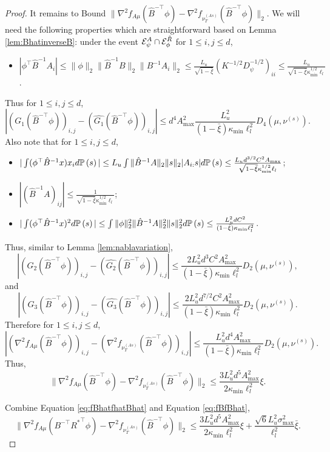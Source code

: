 \begin{proof}
	
	It remains to Bound $\|\nabla^2 f_{A\mu}(\hat{B}^{-\top}\phi) - \nabla^2 f_{\nu_T^{(As)}}(\hat{B}^{-\top}\phi)\|_2$. 
	We will need the following properties which are straightforward based on Lemma \ref{lem:BhatinverseB}: 
	under the event $ \mathcal{E}^A_{\psi}\cap \mathcal{E}^{\tilde{R}}_{\phi} $ for $1\le i, j\le d$,
	\begin{itemize}
		\item $|\phi^{\top}\hat{B}^{-1}A_i| \le \|\phi\|_2\|\hat{B}^{-1}B\|_2\|B^{-1}A_i\|_2\le
		\frac{L_u}{\sqrt{1-\bar{\xi}}} (K^{-1/2}D^{-1/2}_{\psi})_{ii}\le
		\frac{L_u}{\sqrt{1-\bar{\xi}}\kappa_{\min}^{1/2}\ell_l}$.
	\end{itemize}
	Thus for $1\le i, j\le d$,
	\[
	|(G_1(\hat{B}^{-\top}\phi))_{i,j} - (\hat{G_1}(\hat{B}^{-\top}\phi))_{i,j}| \le
	d^4A^2_{\max}\frac{L_u^2}{(1-\bar{\xi})\kappa_{\min}\ell_l^2}D_4(\mu,\nu^{(s)}).
	\]
	Also note that for $1\le i, j\le d$,
	\begin{itemize}
		\itemsep0em
		\item $|\int(\phi^{\top}\hat{B}^{-1}x)x_i d\mathbb{P}\left(s\right)| 
		\le L_u\int \|\hat{B}^{-1}A\|_2\|s\|_2 |A_{i:}s| d\mathbb{P}\left(s\right)
		\le \frac{L_ud^{3/2}C^2A_{\max}}{\sqrt{1-\bar{\xi}}\kappa_{\min}^{1/2}\ell_l}$; 
		\item $|(\hat{B}^{-1}A)_{ij}| \le \frac{1}{\sqrt{1-\bar{\xi}}\kappa_{\min}^{1/2}\ell_l}$;
		\item $|\int(\phi^{\top}\hat{B}^{-1}x)^2 d\mathbb{P}\left(s\right)|\le
		\int \|\phi\|_2^2 \|\hat{B}^{-1}A\|_2^2\|s\|_2^2 d\mathbb{P}\left(s\right) \le \frac{L_u^2dC^2}{(1-\bar{\xi})\kappa_{\min}\ell_l^2}$.
	\end{itemize}
	Thus, similar to Lemma \ref{lem:nablavariation},
	\[
	|(G_2(\hat{B}^{-\top}\phi))_{i,j} - (\hat{G_2}(\hat{B}^{-\top}\phi))_{i,j}| \le
	\frac{2L_u^2d^3C^2A^2_{\max}}{(1-\bar{\xi})\kappa_{\min}\ell_l^2}D_2(\mu,\nu^{(s)}),
	\]
	and 
	\[
	|(G_3(\hat{B}^{-\top}\phi))_{i,j} - (\hat{G_3}(\hat{B}^{-\top}\phi))_{i,j}| \le
	\frac{2L_u^2d^{7/2}C^2A^2_{\max}}{(1-\bar{\xi})\kappa_{\min}\ell_l^2}D_2(\mu,\nu^{(s)}).
	\]
	Therefore for $1\le i,j\le d$,
	\[
	\left|\left(\nabla^2 f_{A\mu}(\hat{B}^{-\top}\phi)\right)_{i,j} - \left(\nabla^2 f_{\nu_T^{(As)}}(\hat{B}^{-\top}\phi)\right)_{i,j}\right| 
	\le
	\frac{L_u^2d^4A^2_{\max}}{(1-\bar{\xi})\kappa_{\min}\ell_l^2}D_2(\mu,\nu^{(s)}). 
	\]
	Thus, 
	\begin{equation}
	\label{eq:fBhatfhatBhat}
	\|\nabla^2 f_{A\mu}(\hat{B}^{-\top}\phi) - \nabla^2 f_{\nu_T^{(As)}}(\hat{B}^{-\top}\phi)\|_2 \le 
	\frac{3L_u^2d^5A^2_{\max}}{2\kappa_{\min}\ell_l^2}\xi.
	\end{equation}
	
	Combine Equation \eqref{eq:fBhatfhatBhat} and Equation \eqref{eq:fBfBhat},
	\[
	\|\nabla^2 f_{A\mu}(B^{-\top}{R^*}^{\top}\phi) - \nabla^2 f_{\nu_T^{(As)}}(\hat{B}^{-\top}\phi)\|_2
	\le 
	\frac{3L_u^2d^5A^2_{\max}}{2\kappa_{\min}\ell_l^2}\xi + \frac{\sqrt{6}L_u^2\sigma_{\max}^2}{\ell_l^2}\bar{\xi}.
	\]
\end{proof}
\fi


